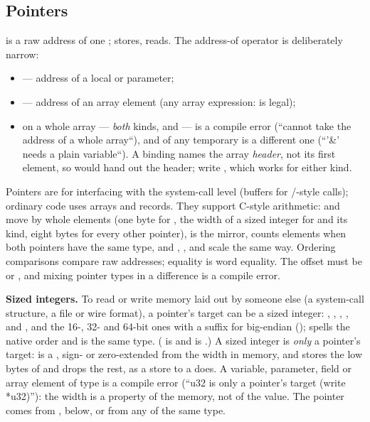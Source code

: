 \subsection{Pointers}
\label{sec:pointers}

 is a raw address of one ;  stores,
 reads. The address-of operator  is deliberately narrow:

\begin{itemize}[nosep]
\item {} --- address of a local or parameter;
\item {} --- address of an array element (any array expression:
   is legal);
\item {} on a whole array --- \emph{both} kinds, \ic{[T]} and
  \ic{[T; N]} --- is a compile error
  (``cannot take the address of a whole array``), and \ic{\&} of any
  temporary is a different one (``'\&' needs a plain variable``). A binding names
  the array \emph{header}, not its first element, so  would hand
  out the header; write , which works for either kind.
\end{itemize}

\noindent Pointers are for interfacing with the system-call level
(buffers for /-style calls); ordinary code uses
arrays and records. They support C-style arithmetic:  and
 move by whole  elements (one byte for , the
width of a sized integer for  and its kind, eight bytes for every
other pointer),  is the mirror,
 counts elements when both pointers have the same type, and
\ic{+=}, \ic{-=}, \ic{++} and \ic{--} scale the same way. Ordering
comparisons compare raw addresses; equality is word equality. The
offset must be  or , and mixing pointer types in a
difference is a compile error.

\noindent\textbf{Sized integers.} To read or write memory laid out by
someone else (a system-call structure, a file or wire format), a pointer's
target can be a sized integer: , , , ,
 and , and the 16-, 32- and 64-bit ones with a 
suffix for big-endian ();  spells the native order and
is the same type. ( is  and  is .) A sized
integer is \emph{only} a pointer's target:  is a , sign- or
zero-extended from the width in memory, and  stores the low
bytes of  and drops the rest, as a store to a  does. A
variable, parameter, field or array element of type  is a compile
error (``u32 is only a pointer's target (write *u32)''): the width is a
property of the memory, not of the value. The pointer comes from
, below, or from any  of the same type.


